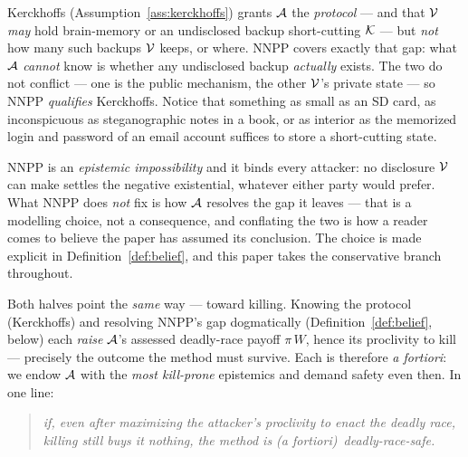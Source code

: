 \begin{assumption}\label{lem:nnpl}
Kerckhoffs (Assumption~\ref{ass:kerckhoffs}) grants $\mathcal{A}$ the
\emph{protocol} --- and that $\mathcal{V}$ \emph{may} hold brain-memory or an
undisclosed backup short-cutting $\mathcal{K}$ --- but \emph{not} how many such backups
$\mathcal{V}$ keeps, or where. NNPP covers exactly that gap: what $\mathcal{A}$
\emph{cannot} know is whether any undisclosed backup \emph{actually} exists. The
two do not conflict --- one is the public mechanism, the other $\mathcal{V}$'s private
state --- so NNPP \emph{qualifies} Kerckhoffs. Notice that something as small as
an SD card, as inconspicuous as steganographic notes in a book, or as interior as
the memorized login and password of an email account suffices to store a
short-cutting state.

NNPP is an \emph{epistemic impossibility} and it binds every attacker: no
disclosure $\mathcal{V}$ can make settles the negative existential, whatever either
party would prefer. What NNPP does \emph{not} fix is how $\mathcal{A}$ resolves
the gap it leaves --- that is a modelling choice, not a consequence, and
conflating the two is how a reader comes to believe the paper has assumed its
conclusion. The choice is made explicit in Definition~\ref{def:belief}, and
this paper takes the conservative branch throughout.

Both halves point the \emph{same} way --- toward killing. Knowing the protocol
(Kerckhoffs) and resolving NNPP's gap dogmatically (Definition~\ref{def:belief},
below) each \emph{raise}
$\mathcal{A}$'s assessed deadly-race payoff $\pi\,W$, hence its proclivity to kill
--- precisely the outcome the method must survive. Each is therefore \emph{a
fortiori}: we endow $\mathcal{A}$ with the \emph{most kill-prone} epistemics and
demand safety even then. In one line:
\begin{quote}\itshape
if, even after maximizing the attacker's proclivity to enact the deadly race,
killing still buys it nothing, the method is \upshape(a fortiori)\itshape\
deadly-race-safe.
\end{quote}
\end{assumption}

